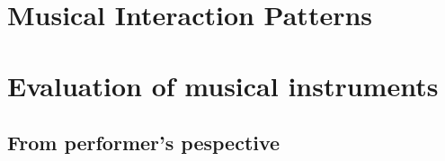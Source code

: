 \section{Musical Interaction Patterns}

\section{Evaluation of musical instruments}
\subsection{From performer's pespective}
